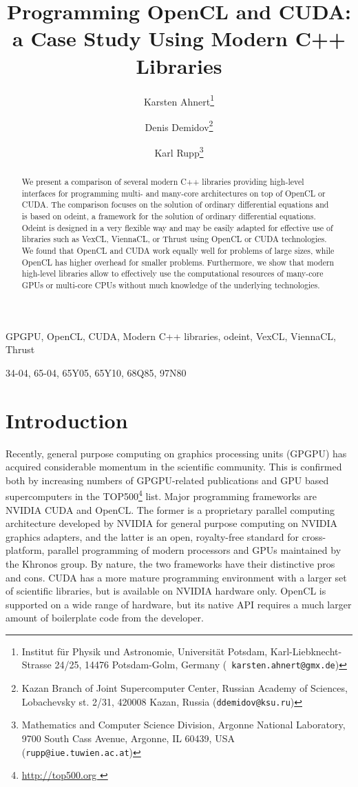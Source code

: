 \documentclass[final]{siamltex}
\title{Programming OpenCL and CUDA:\\a Case Study Using Modern C++ Libraries}
\author{
Karsten Ahnert\thanks{Institut f\"ur Physik und Astronomie, Universit\"at Potsdam,
Karl-Liebknecht-Strasse 24/25, 14476 Potsdam-Golm, Germany ({\tt
karsten.ahnert@gmx.de}) }
\and Denis Demidov\thanks{
Kazan Branch of Joint Supercomputer Center,
Russian Academy of Sciences,
Lobachevsky st. 2/31, 420008 Kazan, Russia
({\tt ddemidov@ksu.ru}) }
\and Karl Rupp\thanks{Mathematics and Computer Science Division,
Argonne National Laboratory,
9700 South Cass Avenue, Argonne, IL 60439, USA
({\tt rupp@iue.tuwien.ac.at}) } }
\begin{document}
\maketitle

\begin{abstract}
    We present a comparison of several modern C++ libraries providing high-level interfaces
    for programming multi- and many-core architectures on top of OpenCL or CUDA.
    The comparison focuses on the solution of ordinary differential equations and is based on odeint,
    a framework for the solution of ordinary differential equations. Odeint is designed in a
    very flexible way and may be easily adapted for effective use of libraries such
    as VexCL, ViennaCL, or Thrust using OpenCL or CUDA technologies.
    We found that OpenCL and CUDA work equally well for problems
    of large sizes, while OpenCL has higher overhead for smaller problems.
    Furthermore, we show that modern high-level libraries allow to effectively
    use the computational resources of many-core GPUs or multi-core CPUs without much
    knowledge of the underlying technologies.
\end{abstract}

\begin{keywords}
    GPGPU, OpenCL, CUDA, Modern C++ libraries, odeint, VexCL, ViennaCL, Thrust
\end{keywords}

\begin{AMS}
    34-04, 65-04, 65Y05, 65Y10, 68Q85, 97N80
\end{AMS}


%
%
\section{Introduction}

\pagestyle{myheadings}

\thispagestyle{plain}


Recently, general purpose computing on graphics processing units (GPGPU) has
acquired considerable momentum in the scientific community. This is confirmed
both by increasing numbers of GPGPU-related publications and GPU based
supercomputers in the TOP500\footnote{ \href{ http://top500.org }{
http://top500.org }} list. Major programming frameworks are NVIDIA CUDA and
OpenCL.  The former is a proprietary parallel computing architecture developed
by NVIDIA for general purpose computing on NVIDIA graphics adapters, and the
latter is an open, royalty-free standard for cross-platform, parallel
programming of modern processors and GPUs maintained by the Khronos group. By nature,
the two frameworks have their distinctive pros and cons. CUDA has a more mature
programming environment with a larger set of scientific libraries, but is
available on NVIDIA hardware only. OpenCL is supported on a wide range of hardware,
but its native API requires a much larger amount of boilerplate code from the
developer.
\end{document}
